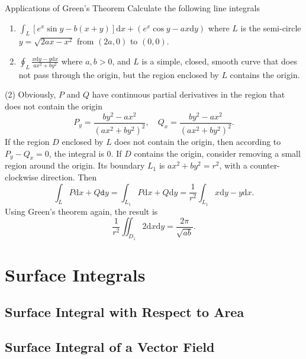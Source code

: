 \begin{example}{Applications of Green's Theorem}{}
  Calculate the following line integrals
  \begin{enumerate}
  \item $\int_L [e^x \sin y - b(x+y)]\mathrm{d} x + (e^x\cos y - ax\mathrm{d}
    y)$ where $L$ is the semi-circle $y = \sqrt{2ax - x^2}$ from $(2a, 0)$ to
    $(0, 0)$.
  \item $\oint_L \frac{x \mathrm{d} y - y \mathrm{d} x}{ax^2 + by^2}$ where
    $a, b> 0$, and
    $L$ is a simple, closed, smooth curve that does not pass through the origin,
    but the region enclosed by $L$ contains the origin.
  \end{enumerate}
\end{example}

\begin{solution}
  (2) Obviously, $P$ and $Q$ have continuous partial derivatives in the region
  that does not contain the origin
  \begin{equation}
    P_y = \frac{by^2 - ax^2}{(ax^2 + by^2)^2}, \quad
    Q_x = \frac{by^2 - ax^2}{(ax^2 + by^2)^2}.
  \end{equation}
  If the region $D$ enclosed by $L$ does not contain the origin,
  then according to $P_y - Q_x = 0$, the integral is $0$.
  If $D$ contains the origin, consider removing a small region around the
  origin.
  Its boundary $L_1$ is $ax^2 + by^2 = r^2$, with a counter-clockwise direction.
  Then
  \begin{equation}
    \int_L P \mathrm{d} x + Q \mathtt{d}y
    = \int_{L_1} P\mathrm{d} x + Q\mathrm{d} y
    = \frac{1}{r^2} \int_{L_1} x\mathrm{d} y - y\mathrm{d} x.
  \end{equation}
  Using Green's theorem again, the result is
  \begin{equation}
    \frac{1}{r^2} \iint_{D_1}2\mathrm{d} x \mathrm{d} y = \frac{2\pi}{\sqrt{ab}}.
  \end{equation}
\end{solution}





\section{Surface Integrals}

\subsection{Surface Integral with Respect to Area}

\subsection{Surface Integral of a Vector Field}



